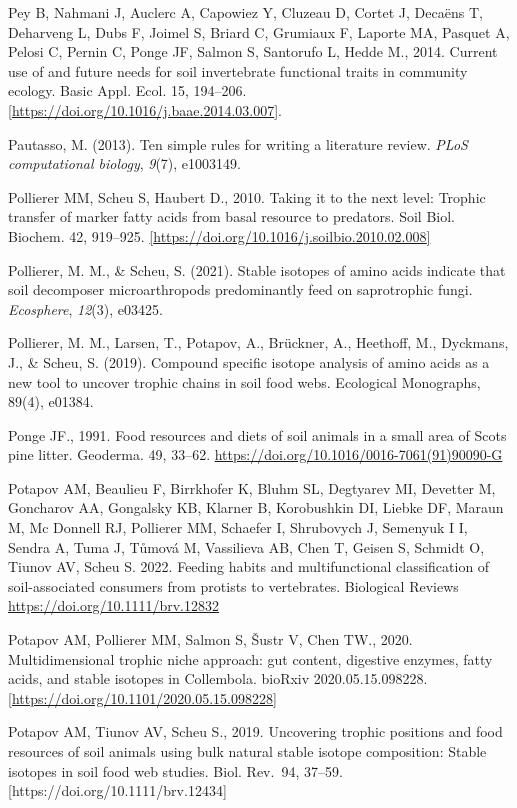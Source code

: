 \documentclass[10pt,oneside]{article}
\begin{document}
Pey B, Nahmani J, Auclerc A, Capowiez Y, Cluzeau D, Cortet J, Decaëns T,
Deharveng L, Dubs F, Joimel S, Briard C, Grumiaux F, Laporte MA, Pasquet
A, Pelosi C, Pernin C, Ponge JF, Salmon S, Santorufo L, Hedde M., 2014.
Current use of and future needs for soil invertebrate functional traits
in community ecology. Basic Appl. Ecol. 15, 194--206.
\href{https://doi.org/10.1016/j.baae.2014.03.007}{{[}https://doi.org/10.1016/j.baae.2014.03.007{]}}.

Pautasso, M. (2013). Ten simple rules for writing a literature review.
\emph{PLoS computational biology}, \emph{9}(7), e1003149.

Pollierer MM, Scheu S, Haubert D., 2010. Taking it to the next level:
Trophic transfer of marker fatty acids from basal resource to predators.
Soil Biol. Biochem. 42, 919--925.
\href{https://doi.org/10.1016/j.soilbio.2010.02.008}{{[}https://doi.org/10.1016/j.soilbio.2010.02.008{]}}

Pollierer, M. M., \& Scheu, S. (2021). Stable isotopes of amino acids
indicate that soil decomposer microarthropods predominantly feed on
saprotrophic fungi. \emph{Ecosphere}, \emph{12}(3), e03425.

Pollierer, M. M., Larsen, T., Potapov, A., Brückner, A., Heethoff, M.,
Dyckmans, J., \& Scheu, S. (2019). Compound specific isotope analysis of
amino acids as a new tool to uncover trophic chains in soil food webs.
Ecological Monographs, 89(4), e01384.

Ponge JF., 1991. Food resources and diets of soil animals in a small
area of Scots pine litter. Geoderma. 49, 33--62.
\url{https://doi.org/10.1016/0016-7061(91)90090-G}

Potapov AM, Beaulieu F, Birrkhofer K, Bluhm SL, Degtyarev MI, Devetter
M, Goncharov AA, Gongalsky KB, Klarner B, Korobushkin DI, Liebke DF,
Maraun M, Mc Donnell RJ, Pollierer MM, Schaefer I, Shrubovych J,
Semenyuk I I, Sendra A, Tuma J, Tůmová M, Vassilieva AB, Chen T, Geisen
S, Schmidt O, Tiunov AV, Scheu S. 2022. Feeding habits and
multifunctional classification of soil-associated consumers from
protists to vertebrates. Biological Reviews
\url{https://doi.org/10.1111/brv.12832}

Potapov AM, Pollierer MM, Salmon S, Šustr V, Chen TW., 2020.
Multidimensional trophic niche approach: gut content, digestive enzymes,
fatty acids, and stable isotopes in Collembola. bioRxiv
2020.05.15.098228.
\href{https://doi.org/10.1101/2020.05.15.098228}{{[}https://doi.org/10.1101/2020.05.15.098228{]}}

Potapov AM, Tiunov AV, Scheu S., 2019. Uncovering trophic positions and
food resources of soil animals using bulk natural stable isotope
composition: Stable isotopes in soil food web studies. Biol. Rev.~94,
37--59. {[}https://doi.org/10.1111/brv.12434{]}
\end{document}
